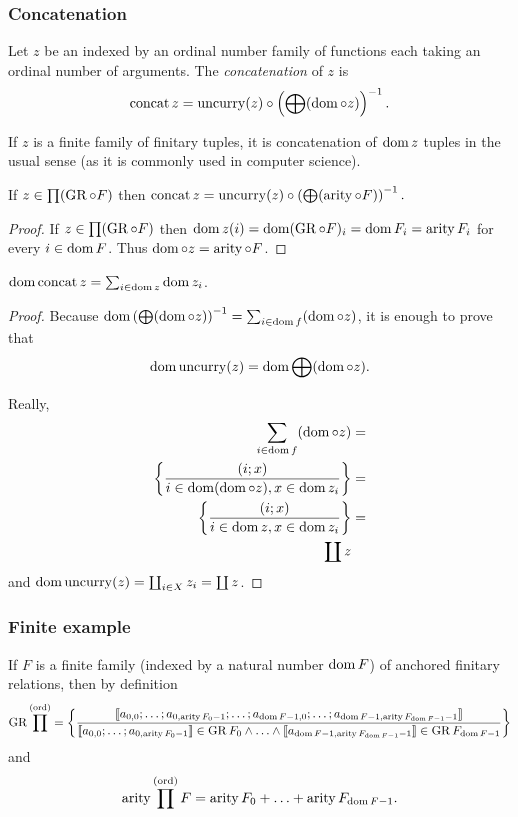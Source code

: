 \subsubsection{Concatenation}
\begin{defn}
Let $z$ be an indexed by an ordinal number
family of functions each taking an ordinal number of arguments. The
\emph{concatenation} of $z$ is
\[
\operatorname{concat} z=\operatorname{uncurry}(z)\circ\left(\bigoplus(\operatorname{dom}\circ z)\right)^{-1}.
\]
\end{defn}
\begin{obvious}
If $z$ is a finite family of finitary tuples, it is concatenation
of $\operatorname{dom} z$ tuples in the usual sense (as it is commonly used in
computer science).\end{obvious}
\begin{prop}
If $z\in\prod(\operatorname{GR}\circ F)$ then $\operatorname{concat} z=\operatorname{uncurry}(z)\circ\left(\bigoplus(\operatorname{arity}\circ F)\right)^{-1}.$\end{prop}
\begin{proof}
If $z\in\prod(\operatorname{GR}\circ F)$ then $\operatorname{dom} z(i)=\operatorname{dom}(\operatorname{GR}\circ F)_{i}=\operatorname{dom} F_{i}=\operatorname{arity} F_{i}$
for every $i\in\operatorname{dom} F$. Thus $\operatorname{dom}\circ z=\operatorname{arity}\circ F$.\end{proof}
\begin{prop}
$\operatorname{dom}\operatorname{concat} z=\sum_{i\in\operatorname{dom} z}\operatorname{dom} z_{i}$.\end{prop}
\begin{proof}
Because $\operatorname{dom}\left(\bigoplus(\operatorname{dom}\circ z)\right)^{-1}=\sum_{i\in\operatorname{dom} f}(\operatorname{dom}\circ z)$,
it is enough to prove that
\[
\operatorname{dom}\operatorname{uncurry}(z)=\operatorname{dom}\bigoplus(\operatorname{dom}\circ z).
\]


Really,
\begin{align*}
\sum_{i\in\operatorname{dom} f}(\operatorname{dom}\circ z) & =\\
\left\{ \frac{(i;x)}{i\in\operatorname{dom}(\operatorname{dom}\circ z),x\in\operatorname{dom} z_{i}}\right\} & =\\
\left\{ \frac{(i;x)}{i\in\operatorname{dom} z,x\in\operatorname{dom} z_{i}}\right\} & =\\
\coprod z
\end{align*}
and $\operatorname{dom}\operatorname{uncurry}(z)=\coprod_{i\in X}z_{i}=\coprod z$.
\end{proof}

\subsubsection{Finite example}

If $F$ is a finite family (indexed by a natural number $\operatorname{dom} F$)
of anchored finitary relations, then by definition \[
\operatorname{GR}\prod^\mathrm{(ord)} =
\left\{ \frac{
\llbracket a_{0, 0} ; \ldots ; a_{0, \operatorname{arity} F_0 - 1} ; \ldots ; a_{\operatorname{dom} F - 1, 0} ; \ldots ; a_{\operatorname{dom} F - 1, \operatorname{arity} F_{\operatorname{dom} F - 1} - 1} \rrbracket
}{
\llbracket a_{0, 0} ; \ldots ; a_{0, \operatorname{arity} F_0 - 1} \rrbracket \in \operatorname{GR} F_0 \land \ldots \land \llbracket a_{\operatorname{dom} F - 1, \operatorname{arity} F_{\operatorname{dom} F - 1} - 1} \rrbracket \in \operatorname{GR} F_{\operatorname{dom} F - 1}
}\right\}
\]and 
\[
\operatorname{arity}\prod^{\mathrm{(ord)}}F=\operatorname{arity} F_{0}+\ldots+\operatorname{arity} F_{\operatorname{dom} F-1}.
\]


